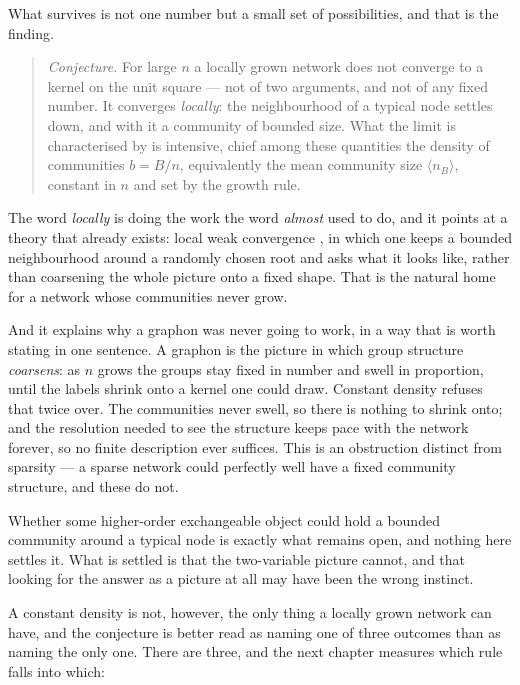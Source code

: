 What survives is not one number but a small set of possibilities, and that is the
finding.

\begin{quote}
\emph{Conjecture.} For large $n$ a locally grown network does not converge to a
kernel on the unit square --- not of two arguments, and not of any fixed number.
It converges \emph{locally}: the neighbourhood of a typical node settles down,
and with it a community of bounded size. What the limit is characterised by is
intensive, chief among these quantities the density of communities $b=B/n$,
equivalently the mean community size $\langle n_B\rangle$, constant in $n$ and set
by the growth rule.
\end{quote}

\noindent The word \emph{locally} is doing the work the word \emph{almost} used
to do, and it points at a theory that already exists: local weak convergence
\citep{benjamini2001}, in which one keeps a bounded neighbourhood around a
randomly chosen root and asks what it looks like, rather than coarsening the
whole picture onto a fixed shape.
That is the natural home for a network whose communities never grow.

And it explains why a graphon was never going to work, in a way that is worth
stating in one sentence. A graphon is the picture in which group structure
\emph{coarsens}: as $n$ grows the groups stay fixed in number and swell in
proportion, until the labels shrink onto a kernel one could draw. Constant density
refuses that twice over. The communities never swell, so there is nothing to shrink
onto; and the resolution needed to see the structure keeps pace with the network
forever, so no finite description ever suffices. This is an obstruction distinct
from sparsity --- a sparse network could perfectly well have a fixed community
structure, and these do not.

Whether some higher-order exchangeable object could hold a bounded community
around a typical node is exactly what remains open, and nothing here settles it.
What is settled is that the two-variable picture cannot, and that looking for the
answer as a picture at all may have been the wrong instinct.

A constant density is not, however, the only thing a locally grown network can
have, and the conjecture is better read as naming one of three outcomes than as
naming the only one. There are three, and the next chapter measures which rule
falls into which:

